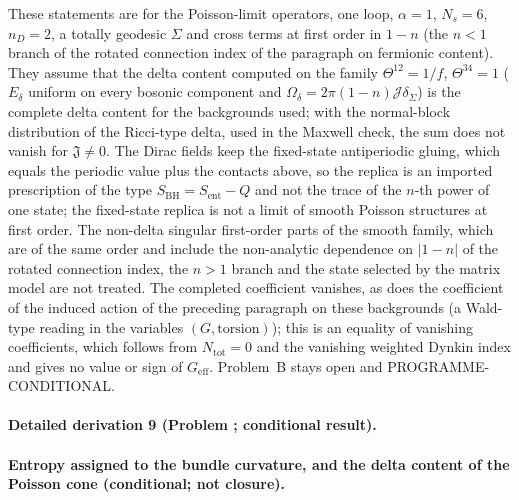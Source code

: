 These statements are for the Poisson-limit operators, one loop, \(\alpha=1\), \(N_s=6\), \(n_D=2\), a totally geodesic \(\Sigma\) and cross terms at first order in \(1-n\) (the \(n<1\) branch of the rotated connection index of the paragraph on fermionic content). They assume that the delta content computed on the family \(\Theta^{12}=1/f\), \(\Theta^{34}=1\) (\(E_\delta\) uniform on every bosonic component and \(\Omega_\delta=2\pi(1-n)\mathcal J\delta_\Sigma\)) is the complete delta content for the backgrounds used; with the normal-block distribution of the Ricci-type delta, used in the Maxwell check, the sum does not vanish for \(\mathfrak J\neq0\). The Dirac fields keep the fixed-state antiperiodic gluing, which equals the periodic value plus the contacts above, so the replica is an imported prescription of the type \(S_{\mathrm{BH}}=S_{\mathrm{ent}}-Q\) and not the trace of the \(n\)-th power of one state; the fixed-state replica is not a limit of smooth Poisson structures at first order. The non-delta singular first-order parts of the smooth family, which are of the same order and include the non-analytic dependence on \(|1-n|\) of the rotated connection index, the \(n>1\) branch and the state selected by the matrix model are not treated. The completed coefficient vanishes, as does the coefficient of the induced action of the preceding paragraph on these backgrounds (a Wald-type reading in the variables \((G,\text{torsion})\)); this is an equality of vanishing coefficients, which follows from \(N_{\mathrm{tot}}=0\) and the vanishing weighted Dynkin index and gives no value or sign of \(G_{\mathrm{eff}}\). Problem~B stays open and PROGRAMME-CONDITIONAL.



\paragraph{Detailed derivation 9 (Problem ; conditional result).} \label{ref:detail-8} %



\paragraph{Entropy assigned to the bundle curvature, and the delta content of the Poisson cone (conditional; not closure).}

